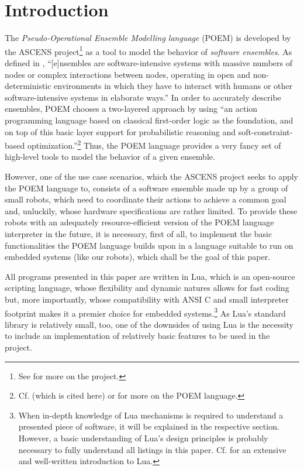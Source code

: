 \chapter*{Introduction}

The \emph{Pseudo-Operational Ensemble Modelling language} (POEM) is developed by the ASCENS project\footnote{See \cite{ASCENS} for more on the project.} as a tool to model the behavior of \emph{software ensembles}. As defined in \cite{AscensTR7}, ``[e]nsembles are software-intensive systems with massive numbers of nodes or complex interactions between nodes, operating in open and non-deterministic environments in which they have to interact with humans or other software-intensive systems in elaborate ways.'' In order to accurately describe ensembles, POEM chooses a two-layered approach by using ``an action programming language based on classical first-order logic as the foundation, and on top of this basic layer support for probabilistic reasoning and soft-constraint-based optimization.''\footnote{Cf. \cite{AscensTR7} (which is cited here) or \cite{AscensJD21} for more on the POEM language.} Thus, the POEM language provides a very fancy set of high-level tools to model the behavior of a given ensemble.

However, one of the use case scenarios, which the ASCENS project seeks to apply the POEM language to, consists of a software ensemble made up by a group of small robots, which need to coordinate their actions to achieve a common goal and, unluckily, whose hardware specifications are rather limited. To provide these robots with an adequately resource-efficient version of the POEM language interpreter in the future, it is necessary, first of all, to implement the basic functionalities the POEM language builds upon in a language suitable to run on embedded systems (like our robots), which shall be the goal of this paper.

All programs presented in this paper are written in Lua, which is an open-source scripting language, whose flexibility and dynamic natures allows for fast coding but, more importantly, whose compatibility with ANSI C and small interpreter footprint makes it a premier choice for embedded systems.\footnote{When in-depth knowledge of Lua mechanisms is required to understand a presented piece of software, it will be explained in the respective section. However, a basic understanding of Lua's design principles is probably necessary to fully understand all listings in this paper. Cf.  \cite{Ierusalimschy2006} for an extensive and well-written introduction to Lua.} As Lua's standard library is relatively small, too, one of the downsides of using Lua is the necessity to include an implementation of relatively basic features to be used in the project.

